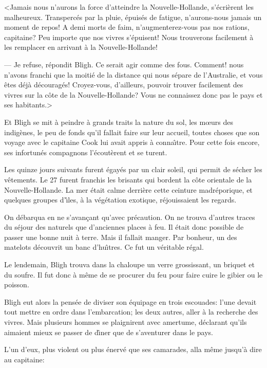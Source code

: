 <Jamais nous n'aurons la force d'atteindre la Nouvelle-Hollande,
s'\'ecri\`erent les malheureux. Transperc\'es
par la pluie, \'epuis\'es de fatigue, n'aurons-nous
jamais un moment de repos! A demi morts de faim,
n'augmenterez-vous pas nos rations, capitaine? Peu importe
que nos vivres s'\'epuisent! Nous trouverons facilement
\`a les remplacer en arrivant \`a la Nouvelle-Hollande!

--- Je refuse, r\'epondit Bligh.
Ce serait agir comme des fous.
Comment! nous n'avons franchi que la moiti\'e
de la distance qui nous s\'epare de l'Australie,
et vous \^etes d\'ej\`a d\'ecourag\'es!
Croyez-vous, d'ailleurs, pouvoir trouver facilement des
vivres sur la c\^ote de la Nouvelle-Hollande?
Vous ne connaissez donc pas le pays et ses habitants.>

Et Bligh se mit \`a peindre \`a grands traits
la nature du sol, les m{\oe}urs des indig\`enes,
le peu de fonds qu'il fallait faire sur leur accueil,
toutes choses que son voyage avec le capitaine Cook
lui avait appris \`a conna{\^\i}tre.
Pour cette fois encore, ses infortun\'es compagnons
l'\'ecout\`erent et se turent.

Les quinze jours suivants furent \'egay\'es
par un clair soleil, qui permit de s\'echer les
v\^etements. Le 27 furent franchis les brisants
qui bordent la c\^ote orientale de la Nouvelle-Hollande.
La mer \'etait calme derri\`ere cette ceinture
madr\'eporique, et quelques groupes d'{\^\i}les,
\`a la v\'eg\'etation exotique,
r\'ejouissaient les regards.

On d\'ebarqua en ne s'avan\c{c}ant qu'avec
pr\'ecaution. On ne trouva d'autres traces du
s\'ejour des naturels que d'anciennes places
\`a feu. Il \'etait donc possible de passer
une bonne nuit \`a terre.
Mais il fallait manger. Par bonheur, un des matelots
d\'ecouvrit un banc d'hu{\^\i}tres.
Ce fut un v\'eritable r\'egal.

Le lendemain, Bligh trouva dans la chaloupe un verre
grossissant, un briquet et du soufre. Il fut donc \`a
m\^eme de se procurer du feu pour faire cuire le gibier
ou le poisson.

Bligh eut alors la pens\'ee de diviser son
\'equipage en trois escouades: l'une devait tout
mettre en ordre dans l'embarcation; les deux autres,
aller \`a la recherche des vivres. Mais plusieurs
hommes se plaignirent avec amertume, d\'eclarant
qu'ils aimaient mieux se passer de d{\^\i}ner que de
s'aventurer dans le pays.

L'un d'eux, plus violent ou plus \'enerv\'e
que ses camarades, alla m\^eme jusqu'\`a dire
au capitaine:

